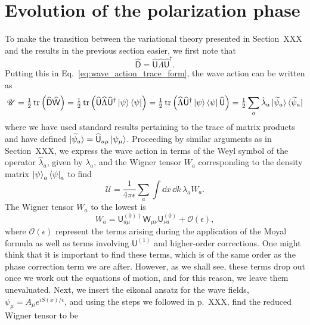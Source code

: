 \section{Evolution of the polarization phase}

To make the transition between the variational theory presented in Section~XXX and the results in the previous section easier, we first note that
%
\begin{equation}
  \widehat{\mathsf{D}} = \widehat{\mathsf{U}}\widehat{\Lambda}\widehat{\mathsf{U}}^{\dagger}.
\end{equation}
%
Putting this in Eq.~\eqref{eq:wave_action_trace_form}, the wave action can be written as
%
\begin{equation}
  \mathscr{U} = \tfrac{1}{2}\operatorname{tr}\left(\widehat{\mathsf{D}}\widehat{\mathsf{W}}\right) = \tfrac{1}{2}\operatorname{tr}\left(\widehat{\mathsf{U}}\widehat{\Lambda}\widehat{\mathsf{U}}^{\dagger}\mathinner{\lvert{\psi}\rangle}\mathinner{\langle{\psi}\rvert}\right) = \tfrac{1}{2}\operatorname{tr}\left(\widehat{\Lambda}\widehat{\mathsf{U}}^{\dagger}\mathinner{\lvert{\psi}\rangle}\mathinner{\langle{\psi}\rvert}\widehat{\mathsf{U}}\right)
  = \tfrac{1}{2}\sum_{a} \hat{\lambda}_{a}\mathinner{\lvert{\widetilde{\psi}_{a}}\rangle}\mathinner{\langle{\widetilde{\psi}_{a}}\rvert}
\end{equation}
%
where we have used standard results pertaining to the trace of matrix products and have defined $\mathinner{\lvert{\widetilde{\psi}_{a}}\rangle} = \widehat{\mathsf{U}}_{a\mu}\mathinner{\lvert{\psi_{\mu}}\rangle}$.
Proceeding by similar arguments as in Section~XXX, we express the wave action in terms of the Weyl symbol of the operator $\hat{\lambda}_{a}$, given by $\lambda_{a}$,  and the Wigner tensor $W_{a}$ corresponding to the density matrix $\mathinner{\lvert{\psi}\rangle}_{a}\mathinner{\langle{\psi}\rvert}_{a}$ to find
%
\begin{equation}
  \mathscr{U} = \frac{1}{4\pi\epsilon}\sum_{a}\int \dd{x}\,\dd{k}\, \lambda_{a} W_{a}.
\end{equation}
%
The Wigner tensor $W_{a}$ to the lowest is
%
\begin{equation}
  W_{a} = \mathsf{U}^{(0)\dagger}_{a\mu}\mathsf{W}_{\mu\nu}\mathsf{U}^{(0)}_{\nu a} + \mathcal{O}(\epsilon),
\end{equation}
%
where $\mathcal{O}(\epsilon)$ represent the terms arising during the application of the Moyal formula as well as terms involving $\mathsf{U}^{(1)}$ and higher-order corrections.
One might think that it is important to find these terms, which is of the same order as the phase correction term we are after.
However, as we shall see, these terms drop out once we work out the equations of motion, and for this reason, we leave them unevaluated.
Next, we insert the eikonal ansatz for the wave fields, $\psi_{\mu} = A_{\mu}e^{iS(x)/\epsilon}$, and using the steps we followed in p.~XXX, find the reduced Wigner tensor to be
